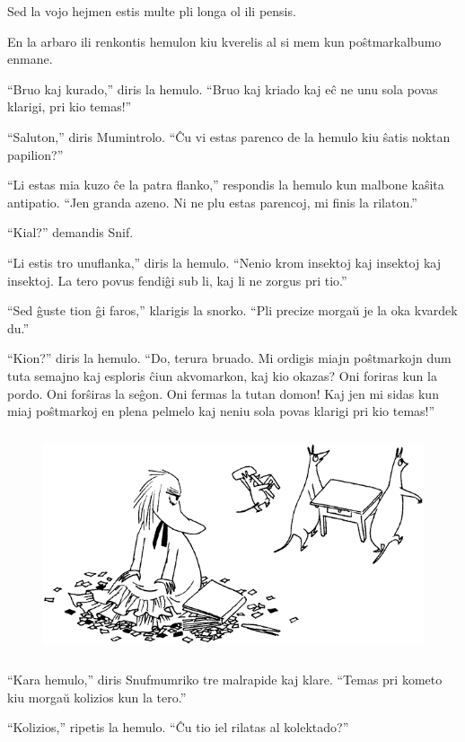 Sed la vojo hejmen estis multe pli longa ol ili pensis.

En la arbaro ili renkontis hemulon kiu kverelis al si mem kun poŝtmarkalbumo enmane.

``Bruo kaj kurado,'' diris la hemulo. ``Bruo kaj kriado kaj eĉ ne unu sola povas klarigi, pri kio temas!''

``Saluton,'' diris Mumintrolo. ``Ĉu vi estas parenco de la hemulo kiu ŝatis noktan papilion?''

``Li estas mia kuzo ĉe la patra flanko,'' respondis la hemulo kun malbone kaŝita antipatio. ``Jen granda azeno. Ni ne plu estas parencoj, mi finis la rilaton.''

``Kial?'' demandis Snif.

``Li estis tro unuflanka,'' diris la hemulo. ``Nenio krom insektoj kaj insektoj kaj insektoj. La tero povus fendiĝi sub li, kaj li ne zorgus pri tio.''

``Sed ĝuste tion ĝi faros,'' klarigis la snorko. ``Pli precize morgaŭ je la oka kvardek du.''

``Kion?'' diris la hemulo. ``Do, terura bruado. Mi ordigis miajn poŝtmarkojn dum tuta semajno kaj esploris ĉiun akvomarkon, kaj kio okazas? Oni foriras kun la pordo. Oni forŝiras la seĝon. Oni fermas la tutan domon! Kaj jen mi sidas kun miaj poŝtmarkoj en plena pelmelo kaj neniu sola povas klarigi pri kio temas!''

\begin{figure}[htbp]
\centering
\includegraphics[width=350pt,height=185pt]{8-3.png}
\caption{}
\label{8-3}
\end{figure}

``Kara hemulo,'' diris Snufmumriko tre malrapide kaj klare. ``Temas pri kometo kiu morgaŭ kolizios kun la tero.''

``Kolizios,'' ripetis la hemulo. ``Ĉu tio iel rilatas al kolektado?''


